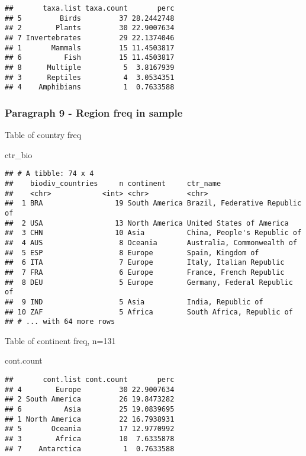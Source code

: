 \documentclass[
]{article}
\newenvironment{Shaded}{\begin{snugshade}}{\end{snugshade}}
\newcommand{\NormalTok}[1]{#1}
\begin{document}
\begin{verbatim}
##       taxa.list taxa.count       perc
## 5         Birds         37 28.2442748
## 2        Plants         30 22.9007634
## 7 Invertebrates         29 22.1374046
## 1       Mammals         15 11.4503817
## 6          Fish         15 11.4503817
## 8      Multiple          5  3.8167939
## 3      Reptiles          4  3.0534351
## 4    Amphibians          1  0.7633588
\end{verbatim}

\hypertarget{paragraph-9---region-freq-in-sample}{%
\subsubsection{Paragraph 9 - Region freq in
sample}\label{paragraph-9---region-freq-in-sample}}

Table of country freq

\begin{Shaded}
\begin{Highlighting}[]
\NormalTok{ctr_bio}
\end{Highlighting}
\end{Shaded}

\begin{verbatim}
## # A tibble: 74 x 4
##    biodiv_countries     n continent     ctr_name                      
##    <chr>            <int> <chr>         <chr>                         
##  1 BRA                 19 South America Brazil, Federative Republic of
##  2 USA                 13 North America United States of America      
##  3 CHN                 10 Asia          China, People's Republic of   
##  4 AUS                  8 Oceania       Australia, Commonwealth of    
##  5 ESP                  8 Europe        Spain, Kingdom of             
##  6 ITA                  7 Europe        Italy, Italian Republic       
##  7 FRA                  6 Europe        France, French Republic       
##  8 DEU                  5 Europe        Germany, Federal Republic of  
##  9 IND                  5 Asia          India, Republic of            
## 10 ZAF                  5 Africa        South Africa, Republic of     
## # ... with 64 more rows
\end{verbatim}

Table of continent freq, n=131

\begin{Shaded}
\begin{Highlighting}[]
\NormalTok{cont.count }
\end{Highlighting}
\end{Shaded}

\begin{verbatim}
##       cont.list cont.count       perc
## 4        Europe         30 22.9007634
## 2 South America         26 19.8473282
## 6          Asia         25 19.0839695
## 1 North America         22 16.7938931
## 5       Oceania         17 12.9770992
## 3        Africa         10  7.6335878
## 7    Antarctica          1  0.7633588
\end{verbatim}
\end{document}
